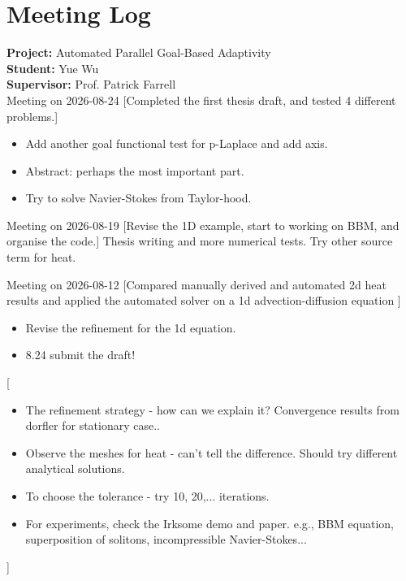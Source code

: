 \documentclass[11pt,a4paper]{article}
\begin{document}
\section*{Meeting Log}


\textbf{Project:} Automated Parallel Goal-Based Adaptivity\\
\textbf{Student:} Yue Wu\\
\textbf{Supervisor:} Prof. Patrick Farrell\\



\meet
{Meeting on 2026-08-24}
[Completed the first thesis draft, and tested 4 different problems.]
{\begin{itemize}
\item Add another goal functional test for p-Laplace and add axis.
\item Abstract: perhaps the most important part.
\item Try to solve Navier-Stokes from Taylor-hood.
\end{itemize}}
\vspace{1.5em}



\meet
{Meeting on 2026-08-19}
[Revise the 1D example, start to working on BBM, and organise the code.]
{Thesis writing and more numerical tests. Try other source term for heat.}
\vspace{1.5em}



\meet
{Meeting on 2026-08-12}
[Compared manually derived and automated 2d heat results and applied the automated solver on a 1d advection-diffusion equation ]
{\begin{itemize}
\item Revise the refinement for the 1d equation.
\item 8.24 submit the draft!
\end{itemize}}
[\begin{itemize}
\item The refinement strategy - how can we explain it? Convergence results from dorfler for stationary case..
\item Observe the meshes for heat - can’t tell the difference. Should try different analytical solutions.
\item To choose the tolerance - try 10, 20,... iterations.
\item For experiments, check the Irksome demo and paper. e.g., BBM equation, superposition of solitons, incompressible Navier-Stokes...
\end{itemize}]
\vspace{1.5em}
\end{document}
